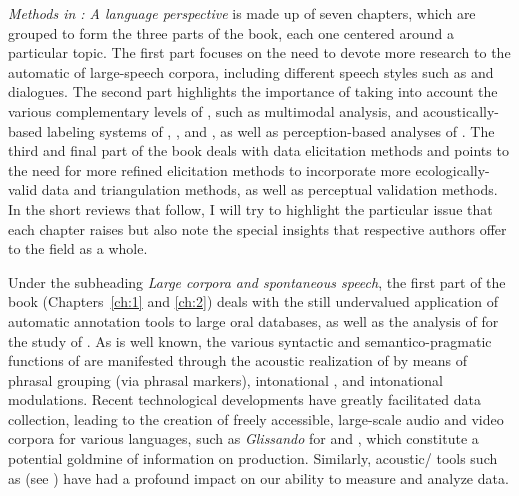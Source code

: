\documentclass[output=paper]{langsci/langscibook}
\begin{document}
\textit{Methods in : A  language perspective} is made up of seven chapters, which are grouped to form the three parts of the book, each one centered around a particular topic. The first part focuses on the need to devote more research to the automatic  of large-speech corpora, including different speech styles such as  and dialogues. The second part highlights the importance of taking into account the various complementary levels of , such as multimodal analysis,  and acoustically-based labeling systems of , , and , as well as perception-based analyses of . The third and final part of the book deals with data elicitation methods and points to the need for more refined elicitation methods to incorporate more ecologically-valid data and triangulation methods, as well as perceptual validation methods. In the short reviews that follow, I will try to highlight the particular issue that each chapter raises but also note the special insights that respective authors offer to the field as a whole.

Under the subheading \textit{Large corpora and spontaneous speech}, the first part of the book (Chapters~\ref{ch:1} and \ref{ch:2}) deals with the still undervalued application of automatic  annotation tools to large oral databases, as well as the analysis of  for the study of . As is well known, the various syntactic and semantico-pragmatic functions of  are manifested through the acoustic realization of  by means of  phrasal grouping (via phrasal  markers), intonational , and intonational modulations. Recent technological developments have greatly facilitated data collection, leading to the creation of freely accessible, large-scale audio and video corpora for various languages, such as \textit{Glissando} for  and , which constitute a potential goldmine of information on  production. Similarly, acoustic\slash {} tools such as  (see \citealt{Boersma.praat}) have had a profound impact on our ability to measure and analyze  data. 
\end{document}
